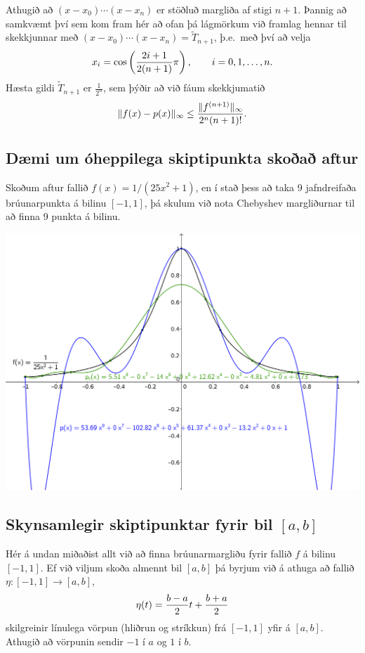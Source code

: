 \documentclass[letterpaper,10pt,icelandic]{sphinxmanual}
\begin{document}
Athugið að \((x-x_0)\cdots (x-x_n)\) er stöðluð margliða af stigi
\(n+1\). Þannig að samkvæmt því sem kom fram hér að
ofan þá lágmörkum við framlag hennar
til skekkjunnar með \((x-x_0)\cdots (x-x_n) = \tilde T_{n+1}\),
þ.e. með því að velja
\begin{gather}
\begin{split}x_i = \cos\left(\frac{2i+1}{2(n+1)}\pi\right), \qquad i=0,1,\ldots,n.\end{split}\notag
\end{gather}
Hæsta gildi \(\tilde T_{n+1}\) er \(\frac 1{2^n}\), sem þýðir að
við fáum skekkjumatið
\begin{gather}
\begin{split}\|f(x)-p(x)\|_\infty \leq \frac{\|f^{(n+1)}\|_\infty}{2^n(n+1)!}.\end{split}\notag
\end{gather}

\subsection{Dæmi um óheppilega skiptipunkta skoðað aftur}
\label{kafli03:daemi-um-oheppilega-skiptipunkta-skoa-aftur}
Skoðum aftur fallið \(f(x) = 1/(25x^2+1)\), en í stað þess að taka 9
jafndreifaða brúunarpunkta á bilinu \([-1,1]\), þá skulum við nota
Chebyshev margliðurnar til að finna 9 punkta á bilinu.

\includegraphics{vond_bruun2.png}


\subsection{Skynsamlegir skiptipunktar fyrir bil \([a,b]\)}
\label{kafli03:skynsamlegir-skiptipunktar-fyrir-bil}
Hér á undan miðaðist allt við að finna brúunarmargliðu fyrir fallið
\(f\) á bilinu \([-1,1]\). Ef við viljum skoða almennt bil
\([a,b]\) þá byrjum við á athuga að fallið
\(\eta:[-1,1]\to [a,b]\),
\begin{gather}
\begin{split}\eta(t) = \frac{b-a}2 t + \frac{b+a}2\end{split}\notag
\end{gather}
skilgreinir línulega vörpun (hliðrun og stríkkun) frá \([-1,1]\)
yfir á \([a,b]\). Athugið að vörpunin sendir \(-1\) í \(a\)
og \(1\) í \(b\).
\end{document}
